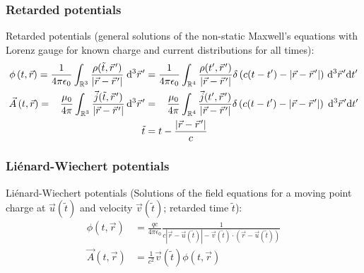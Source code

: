 		\subsubsection{Retarded potentials}
			\label{Sec:RetardedPotentials}
			\noindent
			Retarded potentials (general solutions of the non-static Maxwell's equations with Lorenz gauge for known charge and current distributions for all times):
			\begin{equation}
				\begin{aligned}
					\phi\left(t,\vec{r}\right)
					= \frac{1}{4\pi\epsilon_0} \int_{\mathbb{R}^3} \frac{\rho(\tilde{t},\pvec{r}')}{\left|\vec{r}-\pvec{r}'\right|}\;\diff^3 \pvec{r}'
					&=	\frac{1}{4\pi\epsilon_0} \int_{\mathbb{R}^4} \frac{\rho(t',\pvec{r}')}{\left|\vec{r}-\pvec{r}'\right|}\delta\left( c(t-t')-\left|\vec{r}-\pvec{r}'\right|\right)\,\diff^3 \pvec{r}'\diff t' \\
					\vec{A}\left(t,\vec{r}\right)
					= \phantom{\epsilon_0} \frac{\mu_0}{4\pi} \int_{\mathbb{R}^3} \frac{\vec{j}(\tilde{t},\pvec{r}')}{\left|\vec{r}-\pvec{r}'\right|}\,\diff^3 \pvec{r}'
					&=	\phantom{\epsilon_0} \frac{\mu_0}{4\pi} \int_{\mathbb{R}^4} \frac{\vec{j}(t',\pvec{r}')}{\left|\vec{r}-\pvec{r}'\right|}\delta\left( c(t-t')-\left|\vec{r}-\pvec{r}'\right|\right)\;\diff^3 \pvec{r}'\diff t' \\
					\tilde{t}&=t-\frac{\left|\vec{r}-\pvec{r}'\right|}{c}
				\end{aligned}
			\end{equation}

		\subsubsection{Liénard-Wiechert potentials}
			\noindent
			Liénard-Wiechert potentials (Solutions of the field equations for a moving point charge at $\vec{u}(\tilde{t})$ and velocity $\vec{v}(\tilde{t})$; retarded time $\tilde{t}$):
			\begin{equation}
				\begin{aligned}
					\phi(t,\vec{r}) & =\frac{q c}{4\pi \epsilon_0}\frac{1}{c \left|\vec{r}-\vec{u}(\tilde{t})\right|-\vec{v}(\tilde{t})\cdot\left(\vec{r}-\vec{u}(\tilde{t})\right)} \\
					\vec{A}(t,\vec{r}) &= \frac{1}{c^2}\vec{v}(\tilde{t})\phi(t,\vec{r}) \\
				\end{aligned}
			\end{equation}

